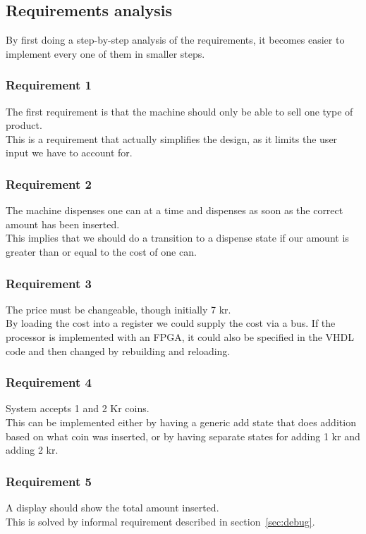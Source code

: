 \subsection{Requirements analysis}
By first doing a step-by-step analysis of the requirements, it becomes easier to implement every one of them in smaller steps.
\subsubsection*{Requirement 1}
The first requirement is that the machine should only be able to sell one type of product.\\
This is a requirement that actually simplifies the design, as it limits the user input we have to account for.

\subsubsection*{Requirement 2}
The machine dispenses one can at a time and dispenses as soon as the correct amount has been inserted.\\
This implies that we should do a transition to a dispense state if our amount is greater than or equal to the cost of one can.

\subsubsection*{Requirement 3}
The price must be changeable, though initially 7 kr.\\
By loading the cost into a register we could supply the cost via a bus. If the processor is implemented with an FPGA, it could also be specified in the VHDL code and then changed by rebuilding and reloading.

\subsubsection*{Requirement 4}
System accepts 1 and 2 Kr coins.\\
This can be implemented either by having a generic add state that does addition based on what coin was inserted, or by having separate states for adding 1 kr and adding 2 kr.

\subsubsection*{Requirement 5}
A display should show the total amount inserted.\\
This is solved by informal requirement described in section~\ref{sec:debug}. 

